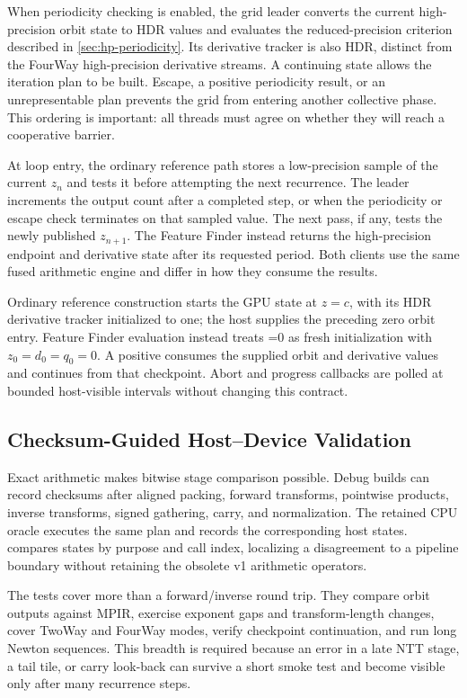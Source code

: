When periodicity checking is enabled, the grid leader converts the current
high-precision orbit state to HDR values and evaluates the reduced-precision
criterion described in \cref{sec:hp-periodicity}.  Its derivative tracker is
also HDR, distinct from the FourWay high-precision derivative streams.
A continuing state allows the iteration plan to be built.  Escape, a positive periodicity result,
or an unrepresentable plan prevents the grid from entering another collective
phase.  This ordering is important: all threads must agree on whether they will
reach a cooperative barrier.

At loop entry, the ordinary reference path stores a low-precision sample of
the current $z_n$ and tests it before attempting the next recurrence.  The
leader increments the output count after a completed step, or when the
periodicity or escape check terminates on that sampled value.  The
next pass, if any, tests the newly published $z_{n+1}$.  The
Feature Finder instead returns the high-precision endpoint and derivative
state after its requested period.  Both clients use the same fused arithmetic
engine and differ in how they consume the results.

Ordinary reference construction starts the GPU state at $z=c$, with its HDR
derivative tracker initialized to one; the host supplies the preceding zero
orbit entry.  Feature Finder evaluation instead treats =0 as
fresh initialization with $z_0=d_0=q_0=0$.  A positive  consumes
the supplied orbit and derivative values and continues from that checkpoint.  Abort and progress callbacks are
polled at bounded host-visible intervals without changing this contract.

\subsection{Checksum-Guided Host--Device Validation}
\label{sec:checksums}

Exact arithmetic makes bitwise stage comparison possible.  Debug builds can
record checksums after aligned packing, forward transforms, pointwise products,
inverse transforms, signed gathering, carry, and normalization.  The retained
 CPU oracle executes the same plan and records
the corresponding host states.   compares states by
purpose and call index, localizing a disagreement to a pipeline boundary
without retaining the obsolete v1 arithmetic operators.

The tests cover more than a forward/inverse round trip.  They compare orbit
outputs against MPIR, exercise exponent gaps and transform-length changes,
cover TwoWay and FourWay modes, verify checkpoint continuation, and run long
Newton sequences.  This breadth is required because an error in a late NTT
stage, a tail tile, or carry look-back can survive a short smoke test and become
visible only after many recurrence steps.

